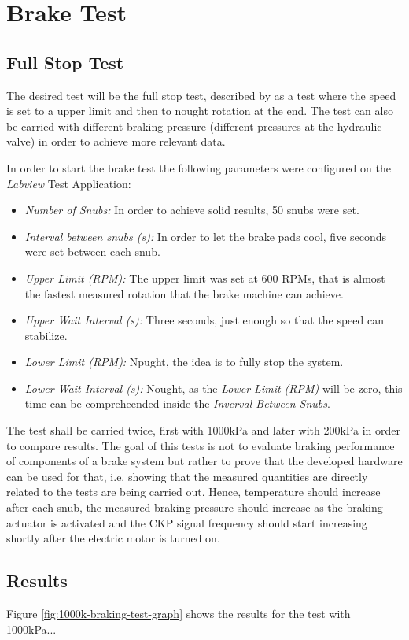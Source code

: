 \section{Brake Test}\label{sec:brakeTest}

	\subsection{Full Stop Test}

	The desired test will be the full stop test, described by \cite{caixeta2017} as a test where the speed is set to a upper limit and then to nought rotation at the end. The test can also be carried with different braking pressure (different pressures at the hydraulic valve) in order to achieve more relevant data.

	\par
	In order to start the brake test the following parameters were configured on the \textit{Labview} Test Application:

	\begin{itemize}Number of Snubs: 
		\item\textit{Number of Snubs:} In order to achieve solid results, 50 snubs were set.
		\item\textit{Interval between snubs (s):} In order to let the brake pads cool, five seconds were set between each snub.
		\item\textit{Upper Limit (RPM):} The upper limit was set at 600 RPMs, that is almost the fastest measured rotation that the brake machine can achieve.
		\item\textit{Upper Wait Interval (s):} Three seconds, just enough so that the speed can stabilize.
		\item\textit{Lower Limit (RPM):} Npught, the idea is to fully stop the system.
		\item\textit{Lower Wait Interval (s):} Nought, as the \textit{Lower Limit (RPM)} will be zero, this time can be compreheended inside the \textit{Inverval Between Snubs}.
	\end{itemize}

	The test shall be carried twice, first with 1000kPa and later with 200kPa in order to compare results. The goal of this tests is not to evaluate braking performance of components of a brake system but rather to prove that the developed hardware can be used for that, i.e. showing that the measured quantities are directly related to the tests are being carried out. Hence, temperature should increase after each snub, the measured braking pressure should increase as the braking actuator is activated and the CKP signal frequency should start increasing shortly after the electric motor is turned on.

	\subsection{Results}

	Figure \ref{fig:1000k-braking-test-graph} shows the results for the test with 1000kPa...